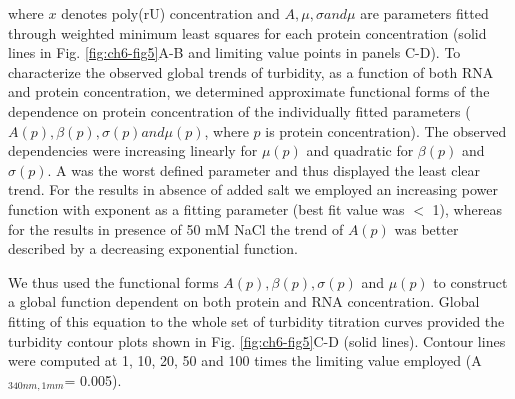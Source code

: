\documentclass[../main.tex]{subfiles}
\begin{document}
        where $x$ denotes poly(rU) concentration and $A, \mu, \sigma and \mu$ are parameters fitted through weighted minimum least squares for each protein concentration (solid lines in Fig. \ref{fig:ch6-fig5}A-B and limiting value points in panels C-D). To characterize the observed global trends of turbidity, as a function of both RNA and protein concentration, we determined approximate functional forms of the dependence on protein concentration of the individually fitted parameters ($A(p), \beta(p), \sigma(p) and \mu(p)$, where $p$ is protein concentration). The observed dependencies were increasing linearly for $\mu(p)$ and quadratic for $\beta(p)$ and $\sigma(p)$. A was the worst defined parameter and thus displayed the least clear trend. For the results in absence of added salt we employed an increasing power function with exponent as a fitting parameter (best fit value was $<$ 1), whereas for the results in presence of 50 mM NaCl the trend of $A(p)$ was better described by a decreasing exponential function.

        We thus used the functional forms $A(p), \beta(p), \sigma(p)$ and $\mu(p)$ to construct a global function dependent on both protein and RNA concentration. Global fitting of this equation to the whole set of turbidity titration curves provided the turbidity contour plots shown in Fig. \ref{fig:ch6-fig5}C-D (solid lines). Contour lines were computed at 1, 10, 20, 50 and 100 times the limiting value employed (A$_{340 nm,1mm }$= 0.005).
\end{document}

